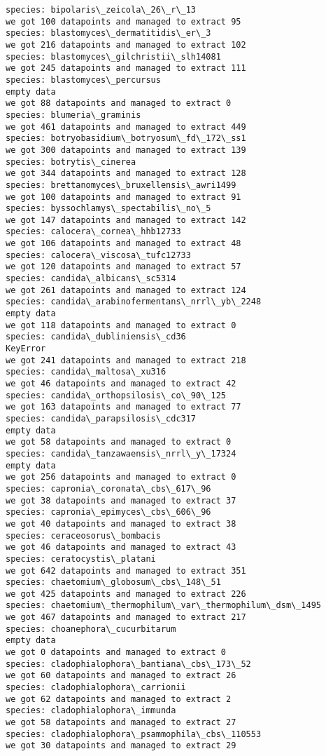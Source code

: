 \documentclass[11pt]{article}
\begin{document}
\begin{Verbatim}[commandchars=\\\{\}]
species: bipolaris\_zeicola\_26\_r\_13
we got 100 datapoints and managed to extract 95
species: blastomyces\_dermatitidis\_er\_3
we got 216 datapoints and managed to extract 102
species: blastomyces\_gilchristii\_slh14081
we got 245 datapoints and managed to extract 111
species: blastomyces\_percursus
empty data
we got 88 datapoints and managed to extract 0
species: blumeria\_graminis
we got 461 datapoints and managed to extract 449
species: botryobasidium\_botryosum\_fd\_172\_ss1
we got 300 datapoints and managed to extract 139
species: botrytis\_cinerea
we got 344 datapoints and managed to extract 128
species: brettanomyces\_bruxellensis\_awri1499
we got 100 datapoints and managed to extract 91
species: byssochlamys\_spectabilis\_no\_5
we got 147 datapoints and managed to extract 142
species: calocera\_cornea\_hhb12733
we got 106 datapoints and managed to extract 48
species: calocera\_viscosa\_tufc12733
we got 120 datapoints and managed to extract 57
species: candida\_albicans\_sc5314
we got 261 datapoints and managed to extract 124
species: candida\_arabinofermentans\_nrrl\_yb\_2248
empty data
we got 118 datapoints and managed to extract 0
species: candida\_dubliniensis\_cd36
KeyError
we got 241 datapoints and managed to extract 218
species: candida\_maltosa\_xu316
we got 46 datapoints and managed to extract 42
species: candida\_orthopsilosis\_co\_90\_125
we got 163 datapoints and managed to extract 77
species: candida\_parapsilosis\_cdc317
empty data
we got 58 datapoints and managed to extract 0
species: candida\_tanzawaensis\_nrrl\_y\_17324
empty data
we got 256 datapoints and managed to extract 0
species: capronia\_coronata\_cbs\_617\_96
we got 38 datapoints and managed to extract 37
species: capronia\_epimyces\_cbs\_606\_96
we got 40 datapoints and managed to extract 38
species: ceraceosorus\_bombacis
we got 46 datapoints and managed to extract 43
species: ceratocystis\_platani
we got 642 datapoints and managed to extract 351
species: chaetomium\_globosum\_cbs\_148\_51
we got 425 datapoints and managed to extract 226
species: chaetomium\_thermophilum\_var\_thermophilum\_dsm\_1495
we got 467 datapoints and managed to extract 217
species: choanephora\_cucurbitarum
empty data
we got 0 datapoints and managed to extract 0
species: cladophialophora\_bantiana\_cbs\_173\_52
we got 60 datapoints and managed to extract 26
species: cladophialophora\_carrionii
we got 62 datapoints and managed to extract 2
species: cladophialophora\_immunda
we got 58 datapoints and managed to extract 27
species: cladophialophora\_psammophila\_cbs\_110553
we got 30 datapoints and managed to extract 29

\end{Verbatim}
\end{document}
